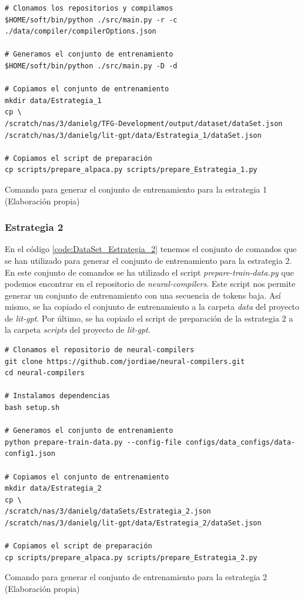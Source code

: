 \begin{mycode}
    \begin{verbatim}
# Clonamos los repositorios y compilamos
$HOME/soft/bin/python ./src/main.py -r -c ./data/compiler/compilerOptions.json

# Generamos el conjunto de entrenamiento
$HOME/soft/bin/python ./src/main.py -D -d

# Copiamos el conjunto de entrenamiento
mkdir data/Estrategia_1
cp \
/scratch/nas/3/danielg/TFG-Development/output/dataset/dataSet.json 
/scratch/nas/3/danielg/lit-gpt/data/Estrategia_1/dataSet.json

# Copiamos el script de preparación
cp scripts/prepare_alpaca.py scripts/prepare_Estrategia_1.py
    \end{verbatim}
    \caption[Comando para generar el conjunto de entrenamiento para la estrategia 1]{Comando para generar el conjunto de entrenamiento para la estrategia 1 (Elaboración propia)}
    \label{code:DataSet_Estrategia_1}
\end{mycode}

\subsubsection{Estrategia 2}
\label{subsubsec:creacion_conjunto:estrategia_2}

En el código \ref{code:DataSet_Estrategia_2} tenemos el conjunto de comandos que se han
utilizado para generar el conjunto de entrenamiento para la estrategia 2. En este conjunto
de comandos se ha utilizado el script \textit{prepare-train-data.py} que podemos encontrar
en el repositorio de \textit{neural-compilers}. Este script nos permite generar un conjunto
de entrenamiento con una secuencia de tokens baja. Así mismo, se ha copiado el conjunto
de entrenamiento a la carpeta \textit{data} del proyecto de \textit{lit-gpt}. Por último,
se ha copiado el script de preparación de la estrategia 2 a la carpeta \textit{scripts}
del proyecto de \textit{lit-gpt}.

\begin{mycode}
    \begin{verbatim}
# Clonamos el repositorio de neural-compilers
git clone https://github.com/jordiae/neural-compilers.git
cd neural-compilers

# Instalamos dependencias
bash setup.sh

# Generamos el conjunto de entrenamiento
python prepare-train-data.py --config-file configs/data_configs/data-config1.json

# Copiamos el conjunto de entrenamiento
mkdir data/Estrategia_2
cp \
/scratch/nas/3/danielg/dataSets/Estrategia_2.json 
/scratch/nas/3/danielg/lit-gpt/data/Estrategia_2/dataSet.json

# Copiamos el script de preparación
cp scripts/prepare_alpaca.py scripts/prepare_Estrategia_2.py
    \end{verbatim}
    \caption[Comando para generar el conjunto de entrenamiento para la estrategia 2]{Comando para generar el conjunto de entrenamiento para la estrategia 2 (Elaboración propia)}
    \label{code:DataSet_Estrategia_2}
\end{mycode}

